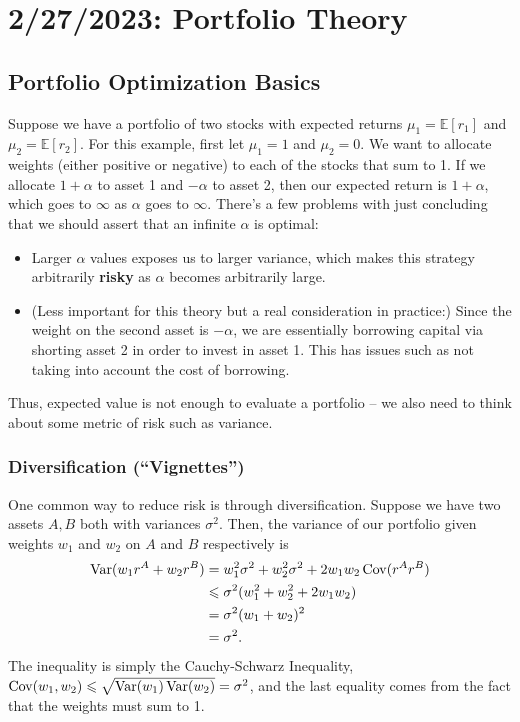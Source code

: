 \chapter{2/27/2023: Portfolio Theory}
\section{Portfolio Optimization Basics}
Suppose we have a portfolio of two stocks with expected returns $\mu_1=\mathbb E[r_1]$ and $\mu_2=\mathbb E[r_2]$. For this example, first let $\mu_1 = 1$ and $\mu_2 = 0$. We want to allocate weights (either positive or negative) to each of the stocks that sum to 1. If we allocate $1+\alpha$ to asset 1 and $-\alpha$ to asset 2, then our expected return is $1+\alpha$, which goes to $\infty$ as $\alpha$ goes to $\infty$. There's a few problems with just concluding that we should assert that an infinite $\alpha$ is optimal: \begin{itemize}
	\item Larger $\alpha$ values exposes us to larger variance, which makes this strategy arbitrarily \textbf{risky} as $\alpha$ becomes arbitrarily large.
	\item (Less important for this theory but a real consideration in practice:) Since the weight on the second asset is $-\alpha$, we are essentially borrowing capital via shorting asset 2 in order to invest in asset 1. This has issues such as not taking into account the cost of borrowing.
\end{itemize} Thus, expected value is not enough to evaluate a portfolio -- we also need to think about some metric of risk such as variance.

\subsection{Diversification (``Vignettes'')}
One common way to reduce risk is through diversification. Suppose we have two assets $A,B$ both with variances $\sigma^2$. Then, the variance of our portfolio given weights $w_1$ and $w_2$ on $A$ and $B$ respectively is \begin{align*}
	\operatorname{Var}(w_1 r^A + w_2r^B) &= w_1^2\sigma^2+w_2^2\sigma^2 + 2w_1w_2\operatorname{Cov}(r^Ar^B) \\
						   &\leqslant \sigma^2(w_1^2+w_2^2 + 2w_1w_2) \\
						   &= \sigma^2(w_1+w_2)^2 \\
						   &= \sigma^2.
\end{align*} The inequality is simply the Cauchy-Schwarz Inequality, $\operatorname{Cov}(w_1,w_2)\leqslant\sqrt{\operatorname{Var}(w_1)\operatorname{Var}(w_2)}=\sigma^2$, and the last equality comes from the fact that the weights must sum to 1.

